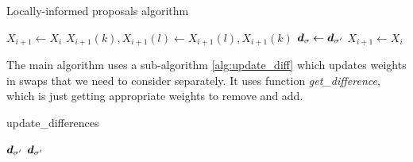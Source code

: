 \begin{algorithm}[!htb]
	\caption{Locally-informed proposals algorithm}\label{alg:loc_neigh}
	\begin{algorithmic}[1]
		
			
			
			
				\State $X_{i+1} \gets X_i$
				\State $X_{i+1}(k), X_{i+1}(l) \gets X_{i+1}(l), X_{i+1}(k)$
				\State $\bm{d}_{\sigma} \gets \bm{d}_{\sigma'}$
			\Else
				\State $X_{i+1} \gets X_i$
			\EndIf
		\EndFor
	\end{algorithmic}
\end{algorithm}
		
The main algorithm uses a sub-algorithm \ref{alg:update_diff} which updates weights in swaps that we need to consider separately. It uses function \textit{get\_difference}, which is just getting appropriate weights to remove and add. 

\begin{algorithm}[!htb]
	\caption{update\_differences}\label{alg:update_diff}
	\begin{algorithmic}[1]
		\Require $\bm{d}_{\sigma'}$
		\Ensure $\bm{d}_{\sigma'}$
			\EndFor
		\EndFor
		
			\EndFor
		\EndFor
	\end{algorithmic}
\end{algorithm}